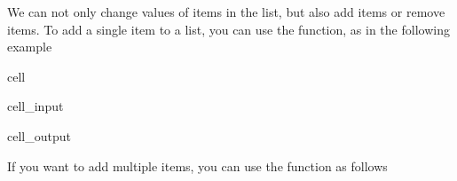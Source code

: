 \documentclass[letterpaper,10pt,english]{jupyterBook}
\begin{document}
\sphinxAtStartPar
We can not only change values of items in the list, but also add items or remove items. To add a single item to a list, you can use the  function, as in the following example

\begin{sphinxuseclass}{cell}\begin{sphinxVerbatimInput}

\begin{sphinxuseclass}{cell_input}
\begin{sphinxVerbatim}[commandchars=\\\{\}]
\end{sphinxVerbatim}

\end{sphinxuseclass}\end{sphinxVerbatimInput}
\begin{sphinxVerbatimOutput}

\begin{sphinxuseclass}{cell_output}
\begin{sphinxVerbatim}[commandchars=\\\{\}]
[3, 6, 4, 6]
\end{sphinxVerbatim}

\end{sphinxuseclass}\end{sphinxVerbatimOutput}

\end{sphinxuseclass}
\sphinxAtStartPar
If you want to add multiple items, you can use the  function as follows
\end{document}
